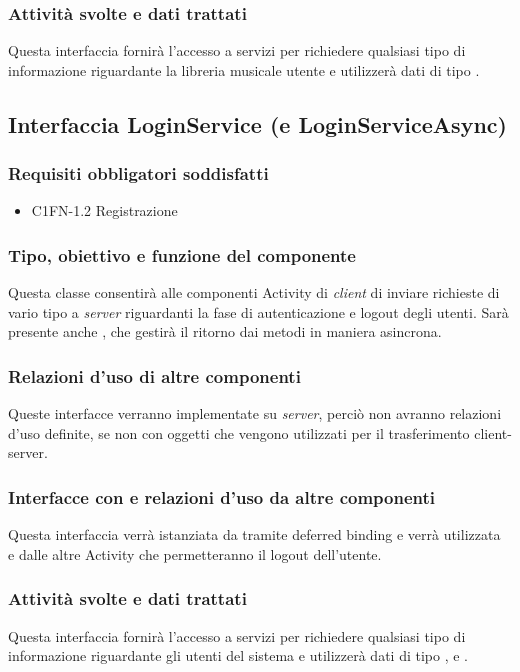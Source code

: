 \subsubsection*{Attivit\`a svolte e dati trattati}
Questa interfaccia fornir\`a l'accesso a servizi per richiedere qualsiasi tipo
di informazione riguardante la libreria musicale utente e utilizzer\`a dati di
tipo .


\subsection{Interfaccia LoginService (e LoginServiceAsync)}
\subsubsection*{Requisiti obbligatori soddisfatti}
\begin{itemize}
	\item C1FN-1.2 Registrazione
\end{itemize}
\subsubsection*{Tipo, obiettivo e funzione del componente}
Questa classe consentir\`a alle componenti Activity di \emph{client} di inviare
richieste di vario tipo a \emph{server} riguardanti la fase di autenticazione e
logout degli utenti. Sar\`a presente anche , che gestir\`a
il ritorno dai metodi in maniera asincrona.

\subsubsection*{Relazioni d'uso di altre componenti}
Queste interfacce verranno implementate su \emph{server}, perci\`o non
avranno relazioni d'uso definite, se non con oggetti  che
vengono utilizzati per il trasferimento client-server.

\subsubsection*{Interfacce con e relazioni d'uso da altre componenti}
Questa interfaccia verr\`a istanziata da  tramite deferred
binding e verr\`a utilizzata \\ e dalle altre Activity che
permetteranno il logout dell'utente.

\subsubsection*{Attivit\`a svolte e dati trattati}
Questa interfaccia fornir\`a l'accesso a servizi per richiedere qualsiasi tipo
di informazione riguardante gli utenti del sistema e utilizzer\`a dati di tipo
,  e .

